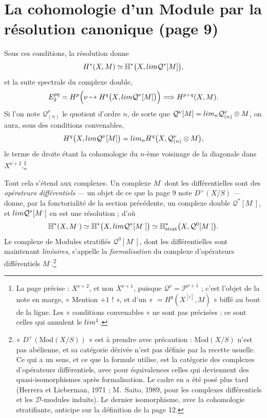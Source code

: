\documentclass[11pt,a4paper]{article}
\begin{document}
\section*{La cohomologie d'un Module par la résolution canonique (page 9)}

Sous ces conditions, la résolution donne
\[
  H^{*}(X, M) \simeq \mathbb{H}^{*}\bigl(X, \varprojlim
  \mathcal{Q}^{*}[M]\bigr) ,
\]
et la suite spectrale du complexe double,
\[
  E_{2}^{pq} = H^{p}\Bigl(\nu \mapsto H^{q}\bigl(X, \varprojlim
  \mathcal{Q}^{\nu}[M]\bigr)\Bigr) \Longrightarrow H^{p+q}(X, M) .
\]
Si l'on note $\mathcal{Q}^{\nu}_{(n)}$ le quotient d'ordre $n$, de sorte que
$\mathcal{Q}^{\nu}[M] = \varprojlim_n \mathcal{Q}^{\nu}_{(n)} \otimes M$, on
aura, sous des conditions convenables,
\[
  H^{q}\bigl(X, \varprojlim \mathcal{Q}^{\nu}[M]\bigr)
  = \varprojlim_{n} H^{q}\bigl(X, \mathcal{Q}^{\nu}_{(n)} \otimes M\bigr) ,
\]
le terme de droite étant la cohomologie du $n$-ème voisinage de la diagonale
dans $X^{\nu+2}$.\footnote{La page précise : $X^{\nu+2}$, et non $X^{\nu+1}$,
puisque $\mathcal{Q}^{\nu} = \mathcal{P}^{\nu+1}$ ; c'est l'objet de la note
en marge, « Mention $+1$ ! », et d'un « $= H^{q}(X^{[i]}, M)$ » biffé au bout
de la ligne. Les « conditions convenables » ne sont pas précisées ; ce sont
celles qui annulent le $\varprojlim^{1}$.}

Tout cela s'étend aux complexes. Un complexe $M^{\cdot}$ dont les
différentielles sont des \emph{opérateurs différentiels} — un objet de ce que
la page 9 note $D^{+}(X/S)$ — donne, par la fonctorialité de la section
précédente, un complexe double $\mathcal{Q}^{*}[M^{\cdot}]$, et
$\varprojlim \mathcal{Q}^{*}[M^{\cdot}]$ en est une résolution ; d'où
\[
  \mathbb{H}^{*}(X, M^{\cdot}) \simeq
  \mathbb{H}^{*}\bigl(X, \varprojlim \mathcal{Q}^{*}[M^{\cdot}]\bigr) \simeq
  \mathbb{H}^{*}_{\mathrm{strat}}\bigl(X, \mathcal{Q}^{0}[M^{\cdot}]\bigr) .
\]
Le complexe de Modules stratifiés $\mathcal{Q}^{0}[M^{\cdot}]$, dont les
différentielles sont maintenant \emph{linéaires}, s'appelle la
\emph{formalisation} du complexe d'opérateurs différentiels
$M^{\cdot}$.\footnote{« $D^{+}(\mathrm{Mod}(X/S))$ » est à prendre avec
précaution : $\mathrm{Mod}(X/S)$ n'est pas abélienne, et sa catégorie
dérivée n'est pas définie par la recette usuelle. Ce qui a un sens, et ce que
la formule utilise, est la catégorie des complexes d'opérateurs
différentiels, avec pour équivalences celles qui deviennent des
quasi-isomorphismes après formalisation. Le cadre en a été posé plus tard
(Herrera et Lieberman, 1971 ; M.~Saito, 1989, pour les complexes
différentiels et les $\mathcal{D}$-modules induits). Le dernier isomorphisme,
avec la cohomologie stratifiante, anticipe sur la définition de la page 12.}
\end{document}
